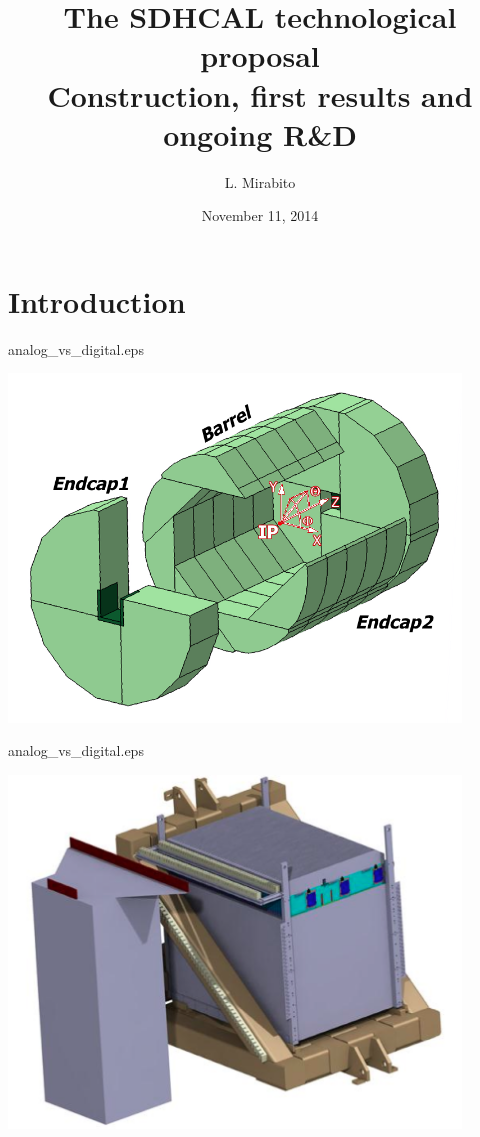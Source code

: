 \documentclass[10pt]{beamer}
\title[The SDHCAL technological proposal]{The SDHCAL technological proposal \\ Construction, first results and ongoing R\&D}
\author{L. Mirabito}
\institute{IPN Lyon, UCB Lyon, IN2P3, CNRS}
\date{November 11, 2014}
\begin{document}


\begin{frame}
\titlepage
\end{frame}


\section{Introduction}
\begin{frame}{analog\_vs\_digital.eps}
    \centerline{\includegraphics[width=0.9\textwidth]{images/IldDhcal}}
\end{frame}
\begin{frame}{analog\_vs\_digital.eps}
    \centerline{\includegraphics[width=0.9\textwidth]{images/DHCALProtoSchema}}
\end{frame}
\end{document}
